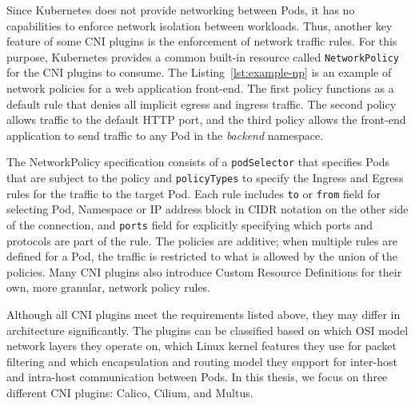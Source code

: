 \documentclass[english, 12pt, a4paper, sci, utf8, a-2b, online]{aaltothesis}
\begin{document}
Since Kubernetes does not provide networking between Pods, it has no capabilities to enforce network isolation between workloads.
Thus, another key feature of some CNI plugins is the enforcement of network traffic rules.
For this purpose, Kubernetes provides a common built-in resource called \texttt{NetworkPolicy} for the CNI plugins to consume.
The Listing~\ref{lst:example-np} is an example of network policies for a web application front-end.
The first policy functions as a default rule that denies all implicit egress and ingress traffic.
The second policy allows traffic to the default HTTP port, and the third policy allows the front-end application to send traffic to any Pod in the \emph{backend} namespace.



The NetworkPolicy specification consists of a \texttt{podSelector} that specifies Pods that are subject to the policy and \texttt{policyTypes} to specify the Ingress and Egress rules for the traffic \cite{budigiri2021network} to the target Pod.
Each rule includes \texttt{to} or \texttt{from} field for selecting Pod, Namespace or IP address block in CIDR notation on the other side of the connection, and \texttt{ports} field for explicitly specifying which ports and protocols are part of the rule.
The policies are additive; when multiple rules are defined for a Pod, the traffic is restricted to what is allowed by the union of the policies.
Many CNI plugins also introduce Custom Resource Definitions for their own, more granular, network policy rules.

Although all CNI plugins meet the requirements listed above, they may differ in architecture significantly.
The plugins can be classified based on which OSI model network layers they operate on, which Linux kernel features they use for packet filtering and which encapsulation and routing model they support for inter-host and intra-host communication between Pods.
In this thesis, we focus on three different CNI plugins: Calico, Cilium, and Multus.


\end{document}
